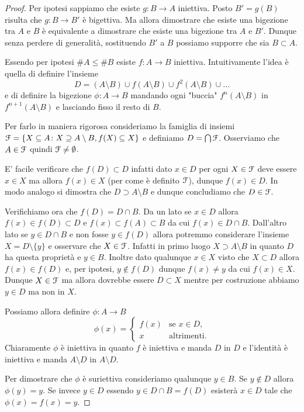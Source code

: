 \begin{proof}
Per ipotesi sappiamo che esiste
$g\colon B\to A$ iniettiva. 
Posto $B'=g(B)$ risulta che $g\colon B\to B'$ è bigettiva.
Ma allora dimostrare che esiste una bigezione tra $A$ e $B$ 
è equivalente a dimostrare che esiste una bigezione tra 
$A$ e $B'$. 
Dunque senza perdere di generalità, sostituendo $B'$ a $B$ 
possiamo supporre che sia $B\subset A$.

Essendo per ipotesi $\#A \le \#B$ esiste $f\colon A \to B$ iniettiva.
Intuitivamente l'idea è quella di definire l'insieme
\[
 D = (A\setminus B)  \cup f(A\setminus B) \cup f^2(A\setminus B) \cup \dots
\]
e di definire la bigezione $\phi \colon A \to B$ mandando ogni "buccia"
$f^n(A\setminus B)$ in $f^{n+1}(A\setminus B)$ e lasciando fisso
il resto di $B$.

Per farlo in maniera rigorosa
consideriamo la famiglia di insiemi $\mathcal F = \{X \subseteq A \colon X \supseteq A \setminus B, f(X) \subseteq X\}$ e definiamo $D = \bigcap \mathcal F$.
Osserviamo che $A \in \mathcal F$ quindi $\mathcal F\neq \emptyset$.

E' facile verificare che $f(D) \subset D$ infatti dato $x\in D$ per ogni $X\in \mathcal F$ deve essere $x\in X$ ma allora $f(x) \in X$ (per come è definito $\mathcal F$), dunque $f(x) \in D$. 
In modo analogo si dimostra che $D\supset A\setminus B$ e dunque concludiamo che $D\in \mathcal F$.

Verifichiamo ora che $f(D)=D\cap B$. Da un lato se $x\in D$ allora
$f(x) \in f(D)\subset D$ e $f(x)\subset f(A)\subset B$ da cui $f(x) \in D\cap B$.
Dall'altro lato se $y\in D \cap B$ e non fosse $y \in f(D)$
allora potremmo considerare l'insieme $X=D\setminus\{y\}$
e osservare che $X\in \mathcal F$.
Infatti in primo luogo $X \supset A \setminus B$ in quanto $D$ ha questa proprietà e $y \in B$.
Inoltre dato qualunque $x \in X$ visto che $X\subset D$ allora
$f(x) \in f(D)$ e, per ipotesi,
$y\not \in f(D)$ dunque $f(x)\neq y$ da cui $f(x) \in X$.
Dunque $X\in \mathcal F$ ma allora dovrebbe essere $D\subset X$ mentre
per costruzione abbiamo $y\in D$ ma non in $X$.


Possiamo allora definire $\phi \colon A \to B$
\[
\phi(x) =
\begin{cases}
   f(x) & \text{se $x\in D$}, \\
   x & \text{altrimenti.}
\end{cases}
\]
Chiaramente $\phi$ è iniettiva in quanto $f$ è iniettiva e manda $D$ in $D$
e l'identità è iniettiva e manda $A\setminus D$ in $A\setminus D$.

Per dimostrare che $\phi$ è suriettiva consideriamo qualunque $y \in B$.
Se $y\not \in D$ allora $\phi(y)=y$.
Se invece $y\in D$ essendo $y\in D\cap B = f(D)$ esisterà $x\in D$ tale
che $\phi(x) = f(x) = y$.
\end{proof}

